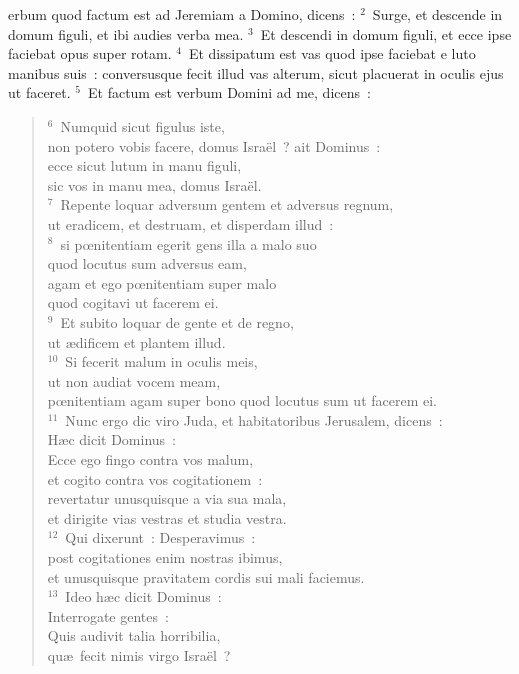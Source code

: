 


\bchapter
{}erbum quod factum est ad Jeremiam a Domino, dicens~:
${}^{2}$~Surge, et descende in domum figuli, et ibi audies verba mea.
${}^{3}$~Et descendi in domum figuli, et ecce ipse faciebat opus super rotam.
${}^{4}$~Et dissipatum est vas quod ipse faciebat e luto manibus suis~: conversusque fecit illud vas alterum, sicut placuerat in oculis ejus ut faceret.
${}^{5}$~Et factum est verbum Domini ad me, dicens~:
\begin{verse}${}^{6}$~Numquid sicut figulus iste,\\ non potero vobis facere, domus Isra\"el~? ait Dominus~:\\ ecce sicut lutum in manu figuli,\\ sic vos in manu mea, domus Isra\"el.\\
${}^{7}$~Repente loquar adversum gentem et adversus regnum,\\ ut eradicem, et destruam, et disperdam illud~:\\
${}^{8}$~si pœnitentiam egerit gens illa a malo suo\\ quod locutus sum adversus eam,\\ agam et ego pœnitentiam super malo\\ quod cogitavi ut facerem ei.\\
${}^{9}$~Et subito loquar de gente et de regno,\\ ut \ae dificem et plantem illud.\\
${}^{10}$~Si fecerit malum in oculis meis,\\ ut non audiat vocem meam,\\ pœnitentiam agam super bono quod locutus sum ut facerem ei.\\
${}^{11}$~Nunc ergo dic viro Juda, et habitatoribus Jerusalem, dicens~:\\ H\ae c dicit Dominus~:\\ Ecce ego fingo contra vos malum,\\ et cogito contra vos cogitationem~:\\ revertatur unusquisque a via sua mala,\\ et dirigite vias vestras et studia vestra.\\
${}^{12}$~Qui dixerunt~: Desperavimus~:\\ post cogitationes enim nostras ibimus,\\ et unusquisque pravitatem cordis sui mali faciemus.\\
${}^{13}$~Ideo h\ae c dicit Dominus~:\\ Interrogate gentes~:\\ Quis audivit talia horribilia,\\ qu\ae\ fecit nimis virgo Isra\"el~?\\

\end{verse}
